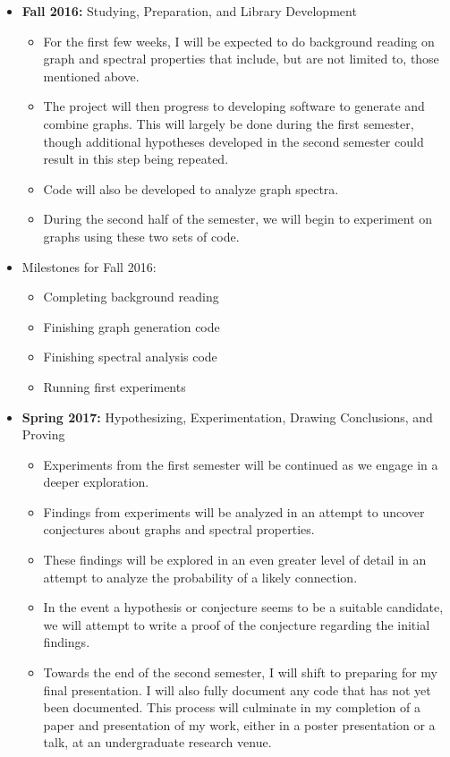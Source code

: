 \documentclass[a4paper,10pt]{article}
\begin{document}
	\begin{itemize}
		\item \textbf{Fall 2016:} Studying, Preparation, and Library Development
		\begin{itemize}
			\item For the first few weeks, I will be expected to do background reading on graph and spectral properties that include, but are not limited to, those mentioned above.
			\item The project will then progress to developing software to generate and combine graphs.  This will largely be done during the first semester, though additional hypotheses developed in the second semester could result in this step being repeated.
			\item Code will also be developed to analyze graph spectra.
			\item During the second half of the semester, we will begin to experiment on graphs using these two sets of code.
		\end{itemize}
		\item Milestones for Fall 2016:
		\begin{itemize}
			\item Completing background reading
			\item Finishing graph generation code
			\item Finishing spectral analysis code
			\item Running first experiments
		\end{itemize}
		\item \textbf{Spring 2017:} Hypothesizing, Experimentation, Drawing Conclusions, and Proving
		\begin{itemize}
			\item Experiments from the first semester will be continued as we engage in a deeper exploration.
			\item Findings from experiments will be analyzed in an attempt to uncover conjectures about graphs and spectral properties.
			\item These findings will be explored in an even greater level of detail in an attempt to analyze the probability of a likely connection.
			\item In the event a hypothesis or conjecture seems to be a suitable candidate, we will attempt to write a proof of the conjecture regarding the initial findings.
			\item Towards the end of the second semester, I will shift to preparing for my final presentation.  I will also fully document any code that has not yet been documented.  This process will culminate in my completion of a paper and presentation of my work, either in a poster presentation or a talk, at an undergraduate research venue.

\end{itemize}
\end{itemize}
\end{document}
